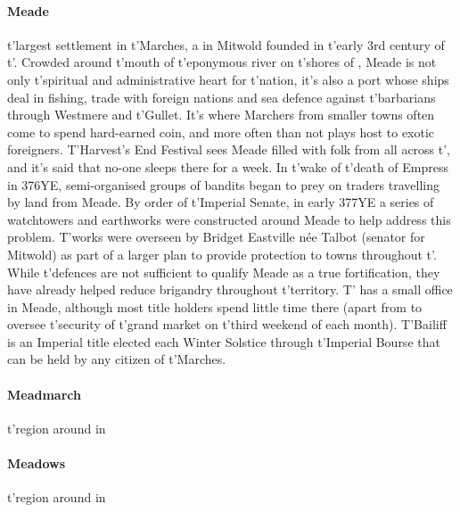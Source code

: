 \paragraph{Meade} t'largest settlement in t'\allowbreak Marches, a  in Mitwold founded in t'\allowbreak early 3rd century of t'\allowbreak {}. Crowded around t'\allowbreak mouth of t'\allowbreak eponymous river on t'\allowbreak shores of , Meade is not only t'\allowbreak spiritual and administrative heart for t'\allowbreak nation, it's also a port whose ships deal in fishing, trade with foreign nations and sea defence against t'\allowbreak barbarians through Westmere and t'\allowbreak Gullet. It's where Marchers from smaller towns often come to spend hard-earned coin, and more often than not plays host to exotic foreigners. T'Harvest's End Festival sees Meade filled with folk from all across t'\allowbreak {}, and it's said that no-one sleeps there for a week. In t'\allowbreak wake of t'\allowbreak death of Empress  in 376YE, semi-organised groups of bandits began to prey on traders travelling by land from Meade. By order of t'\allowbreak Imperial Senate, in early 377YE a series of watchtowers and earthworks were constructed around Meade to help address this problem. T'works were overseen by Bridget Eastville née Talbot (senator for Mitwold) as part of a larger plan to provide protection to towns throughout t'\allowbreak {}. While t'\allowbreak defences are not sufficient to qualify Meade as a true fortification, they have already helped reduce brigandry throughout t'\allowbreak territory. T' has a small office in Meade, although most title holders spend little time there (apart from to oversee t'\allowbreak security of t'\allowbreak grand market on t'\allowbreak third weekend of each month). T'Bailiff is an Imperial title elected each Winter Solstice through t'\allowbreak Imperial Bourse that can be held by any citizen of t'\allowbreak Marches. 
\paragraph{Meadmarch} t'\allowbreak region around  in 
\paragraph{Meadows} t'\allowbreak region around  in 
